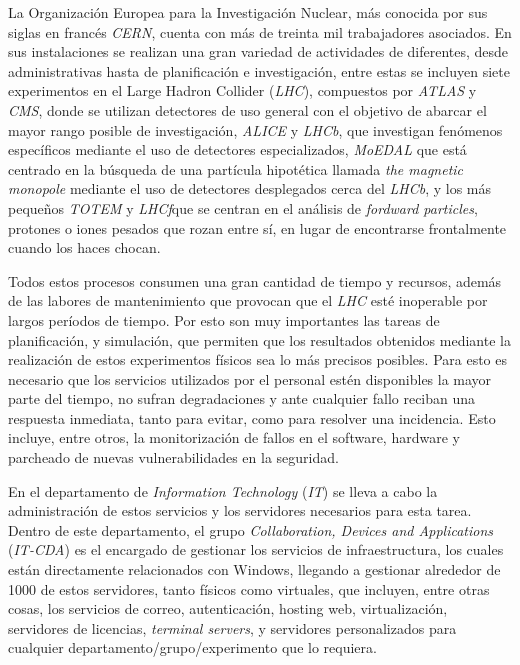 \label{sec:int}



La Organización Europea para la Investigación Nuclear, más conocida por sus siglas en francés \textit{CERN}, cuenta con más de treinta mil trabajadores asociados. En sus instalaciones se realizan una gran variedad de actividades de diferentes, desde administrativas hasta de planificación e investigación, entre estas se incluyen siete experimentos en el Large Hadron Collider (\textit{LHC}), compuestos por \textit{ATLAS} y \textit{CMS}, donde se utilizan detectores de uso general con el objetivo de abarcar el mayor rango posible de investigación, \textit{ALICE} y \textit{LHCb}, que investigan fenómenos específicos mediante el uso de detectores especializados, \textit{MoEDAL} que está centrado en la búsqueda de una partícula hipotética llamada \textit{the magnetic monopole} mediante el uso de detectores desplegados cerca del \textit{LHCb}, y los más pequeños \textit{TOTEM} y \textit{LHCf}que se centran en el análisis de \textit{fordward particles}, protones o iones pesados que rozan entre sí, en lugar de encontrarse frontalmente cuando los haces chocan. \cite{lhc}

Todos estos procesos consumen una gran cantidad de tiempo y recursos, además de las labores de mantenimiento que provocan que el \textit{LHC} esté inoperable por largos períodos de tiempo. Por esto son muy importantes las tareas de planificación,  y simulación, que permiten que los resultados obtenidos mediante la realización de estos experimentos físicos sea lo más precisos posibles. Para esto es necesario que los servicios utilizados por el personal estén disponibles la mayor parte del tiempo, no sufran degradaciones y ante cualquier fallo reciban una respuesta inmediata, tanto para evitar, como para resolver una incidencia. Esto incluye, entre otros, la monitorización de fallos en el software, hardware y parcheado de nuevas vulnerabilidades en la seguridad.

En el departamento de \textit{Information Technology} (\textit{IT}) se lleva a cabo la administración de estos servicios y los servidores necesarios para esta tarea. Dentro de este departamento, el grupo \textit{Collaboration, Devices and Applications} (\textit{IT-CDA}) es el encargado de gestionar los servicios de infraestructura, los cuales están directamente relacionados con Windows, llegando a gestionar alrededor de 1000 de estos servidores, tanto físicos como virtuales, que incluyen, entre otras cosas, los servicios de correo, autenticación, hosting web, virtualización, servidores de licencias, \textit{terminal servers}, y servidores personalizados para cualquier departamento/grupo/experimento que lo requiera. \cite{infraservicios,infrawindows}

